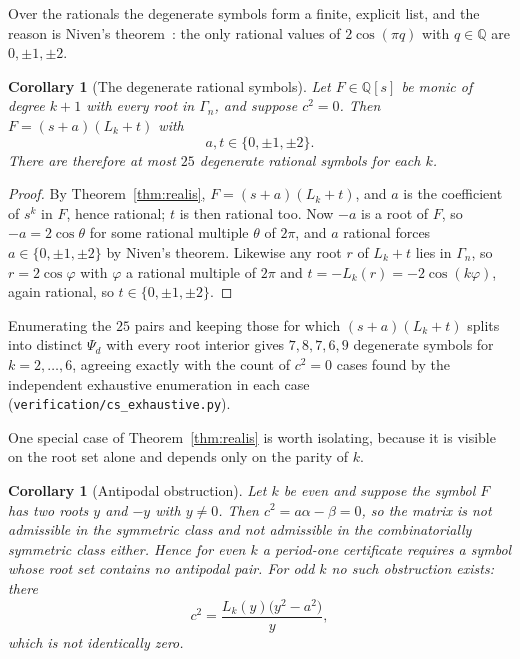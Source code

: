 \documentclass[11pt]{article}
\newtheorem{corollary}[theorem]{Corollary}
\theoremstyle{definition}
\begin{document}
\noindent
Over the rationals the degenerate symbols form a finite, explicit list, and the
reason is Niven's theorem~\cite{niven}: the only rational values of
$2\cos(\pi q)$ with $q\in\mathbb Q$ are $0,\pm1,\pm2$.

\begin{corollary}[The degenerate rational symbols]\label{cor:niven}
Let $F\in\mathbb Q[s]$ be monic of degree $k+1$ with every root in $\Gamma_n$,
and suppose $c^{2}=0$. Then $F=(s+a)(L_k+t)$ with
\[
  a,t\in\{0,\pm1,\pm2\}.
\]
There are therefore at most $25$ degenerate rational symbols for each $k$.
\end{corollary}

\begin{proof}
By Theorem~\ref{thm:realis}, $F=(s+a)(L_k+t)$, and $a$ is the coefficient of
$s^{k}$ in $F$, hence rational; $t$ is then rational too. Now $-a$ is a root of
$F$, so $-a=2\cos\theta$ for some rational multiple $\theta$ of $2\pi$, and $a$
rational forces $a\in\{0,\pm1,\pm2\}$ by Niven's theorem. Likewise any root $r$
of $L_k+t$ lies in $\Gamma_n$, so $r=2\cos\varphi$ with $\varphi$ a rational
multiple of $2\pi$ and $t=-L_k(r)=-2\cos(k\varphi)$, again rational, so
$t\in\{0,\pm1,\pm2\}$.
\end{proof}

\noindent
Enumerating the $25$ pairs and keeping those for which $(s+a)(L_k+t)$ splits
into distinct $\Psi_d$ with every root interior gives $7,8,7,6,9$ degenerate
symbols for $k=2,\dots,6$, agreeing exactly with the count of $c^{2}=0$ cases
found by the independent exhaustive enumeration in each case
(\texttt{verification/cs\_exhaustive.py}).

One special case of Theorem~\ref{thm:realis} is worth isolating, because it is
visible on the root set alone and depends only on the parity of $k$.

\begin{corollary}[Antipodal obstruction]\label{thm:antipodal}
Let $k$ be even and suppose the symbol $F$ has two roots $y$ and $-y$ with
$y\ne0$. Then $c^{2}=a\alpha-\beta=0$, so the matrix is not admissible in the
symmetric class and not admissible in the combinatorially symmetric class
either. Hence for even $k$ a period-one certificate requires a symbol whose
root set contains no antipodal pair. For odd $k$ no such obstruction exists:
there
\[
  c^{2}=\frac{L_k(y)\bigl(y^{2}-a^{2}\bigr)}{y},
\]
which is not identically zero.
\end{corollary}
\end{document}
